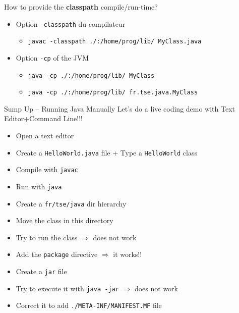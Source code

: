\documentclass[English,c,%
hyperref={%
    pdftitle={FISA-DE2 OOP in Java},%
    pdfauthor={Muller, Gravier, Laforest, Subercaze},%
    pdfsubject={OOP in Java},%
    pdfkeywords={OOP, Java}%
    },%
xcolor={pdftex,svgnames} %
]{beamer}
\begin{document}
\begin{frame}{How to provide the \textbf{classpath} compile/run-time?}
\begin{itemize}
    \item Option \texttt{-classpath} du compilateur
        \begin{itemize}
            \item \texttt{javac -classpath ./:/home/prog/lib/  MyClass.java}
    \end{itemize}
    \item Option \texttt{-cp} of the JVM
    \begin{itemize}
        \item \texttt{java -cp ./:/home/prog/lib/  MyClass}
        \item \texttt{java -cp ./:/home/prog/lib/  fr.tse.java.MyClass}
    \end{itemize}
\end{itemize}

\end{frame}

\begin{frame}{Sump Up -- Running Java Manually}
Let's do a live coding demo with Text Editor+Command Line!!!
\begin{itemize}
  \item Open a text editor
  \item Create a \texttt{HelloWorld.java} file + Type a \texttt{HelloWorld} class
  \item Compile with \texttt{javac}
  \item Run with \texttt{java}
  \medskip
  \item Create a \texttt{fr/tse/java} dir hierarchy
  \item Move the class in this directory
  \item Try to run the class $\Rightarrow$ does not work
  \item Add the \texttt{package} directive $\Rightarrow$ it works!!
  \medskip
  \item Create a \texttt{jar} file
  \item Try to execute it with \texttt{java -jar} $\Rightarrow$ does not work
  \item Correct it to add \texttt{./META-INF/MANIFEST.MF} file
\end{itemize}
\end{frame}
\end{document}
